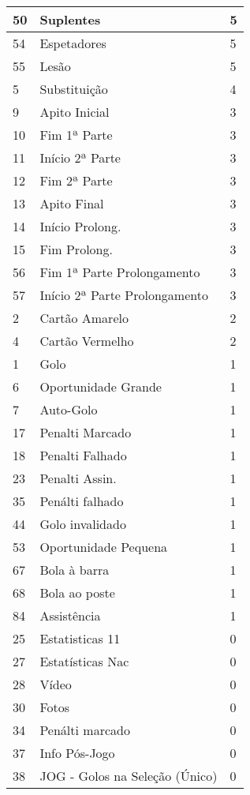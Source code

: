 \begin{longtable}{| p{} | p{} | p{} |}
    50 & Suplentes & 5 \\ \hline
    54 & Espetadores & 5 \\ \hline
    55 & Lesão & 5 \\ \hline
    5 & Substituição & 4 \\ \hline
    9 & Apito Inicial & 3 \\ \hline
    10 & Fim 1ª Parte & 3 \\ \hline
    11 & Início 2ª Parte & 3 \\ \hline
    12 & Fim 2ª Parte & 3 \\ \hline
    13 & Apito Final & 3 \\ \hline
    14 & Início Prolong. & 3 \\ \hline
    15 & Fim Prolong. & 3 \\ \hline
    56 & Fim 1ª Parte Prolongamento & 3 \\ \hline
    57 & Início 2ª Parte Prolongamento & 3 \\ \hline
    2 & Cartão Amarelo & 2 \\ \hline
    4 & Cartão Vermelho & 2 \\ \hline
    1 & Golo & 1 \\ \hline
    6 & Oportunidade Grande & 1 \\ \hline
    7 & Auto-Golo & 1 \\ \hline
    17 & Penalti Marcado & 1 \\ \hline
    18 & Penalti Falhado & 1 \\ \hline
    23 & Penalti Assin. & 1 \\ \hline
    35 & Penálti falhado & 1 \\ \hline
    44 & Golo invalidado & 1 \\ \hline
    53 & Oportunidade Pequena & 1 \\ \hline
    67 & Bola à barra & 1 \\ \hline
    68 & Bola ao poste & 1 \\ \hline
    84 & Assistência & 1 \\ \hline
    25 & Estatisticas 11 & 0 \\ \hline
    27 & Estatísticas Nac & 0 \\ \hline
    28 & Vídeo & 0 \\ \hline
    30 & Fotos & 0 \\ \hline
    34 & Penálti marcado & 0 \\ \hline
    37 & Info Pós-Jogo & 0 \\ \hline
    38 & JOG - Golos na Seleção (Único) & 0 \\ \hline

\end{longtable}
